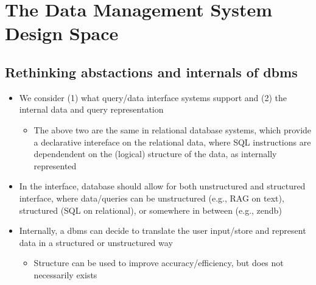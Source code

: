 \section{The Data Management System Design Space}
\subsection{Rethinking abstactions and internals of dbms}
\begin{itemize}
    \item We consider (1) what query/data interface systems support and (2) the internal data and query representation
    \begin{itemize}
    \item The above two are the same in relational database systems, which provide a declarative intereface on the relational data, where SQL instructions are dependendent on the (logical) structure of the data, as internally represented
    \end{itemize}
    \item In the interface, database should allow for both unstructured and structured interface, where data/queries can be unstructured (e.g., RAG on text), structured (SQL on relational), or somewhere in between (e.g., zendb)
    \item Internally, a dbms can decide to translate the user input/store and represent data in a structured or unstructured way
    \begin{itemize}
        \item Structure can be used to improve accuracy/efficiency, but does not necessarily exists
    \end{itemize}
    
\end{itemize}

